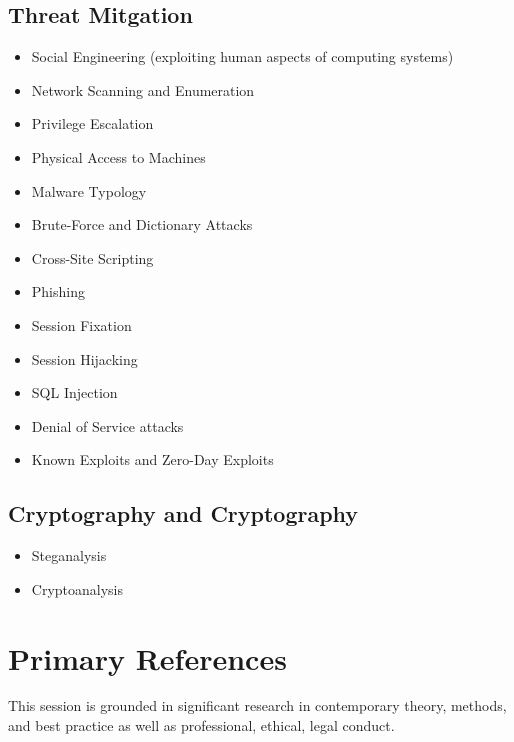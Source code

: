 \documentclass[letterpaper,10pt,english]{sphinxmanual}
\begin{document}
\subsection{Threat Mitgation}
\label{cybersecurity:threat-mitgation}\begin{itemize}
\item {} 
Social Engineering (exploiting human aspects of computing systems)

\item {} 
Network Scanning and Enumeration

\item {} 
Privilege Escalation

\item {} 
Physical Access to Machines

\item {} 
Malware Typology

\item {} 
Brute-Force and Dictionary Attacks

\item {} 
Cross-Site Scripting

\item {} 
Phishing

\item {} 
Session Fixation

\item {} 
Session Hijacking

\item {} 
SQL Injection

\item {} 
Denial of Service attacks

\item {} 
Known Exploits and Zero-Day Exploits

\end{itemize}


\subsection{Cryptography and Cryptography}
\label{cybersecurity:cryptography-and-cryptography}\begin{itemize}
\item {} 
Steganalysis

\item {} 
Cryptoanalysis

\end{itemize}


\section{Primary References}
\label{cybersecurity:primary-references}
This session is grounded in significant research in contemporary theory, methods, and best practice as well as professional, ethical, legal conduct.
\end{document}
